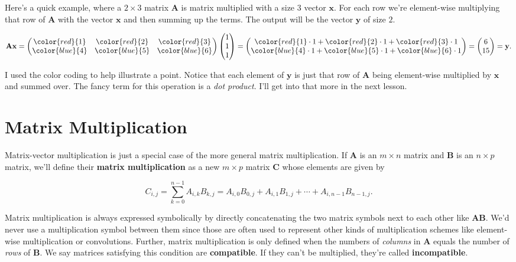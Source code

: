 \documentclass[
  letterpaper,
  DIV=11,
  numbers=noendperiod]{scrreprt}
\begin{document}
Here's a quick example, where a \(2 \times 3\) matrix \(\mathbf{A}\) is
matrix multiplied with a size \(3\) vector \(\mathbf{x}\). For each row
we're element-wise multiplying that row of \(\mathbf{A}\) with the
vector \(\mathbf{x}\) and then summing up the terms. The output will be
the vector \(\mathbf{y}\) of size \(2\).

\[
\mathbf{A} \mathbf{x} = 
\begin{pmatrix}
\color{red}{1} & \color{red}{2} & \color{red}{3} \\
\color{blue}{4} & \color{blue}{5} & \color{blue}{6}
\end{pmatrix}
\begin{pmatrix}
1 \\
1 \\
1
\end{pmatrix} = 
\begin{pmatrix}
\color{red}{1} \cdot 1 + \color{red}{2} \cdot 1 + \color{red}{3} \cdot 1 \\
\color{blue}{4} \cdot 1 + \color{blue}{5} \cdot 1 + \color{blue}{6} \cdot 1 \\
\end{pmatrix} = 
\begin{pmatrix}
6 \\
15
\end{pmatrix} = \mathbf{y}.
\]

I used the color coding to help illustrate a point. Notice that each
element of \(\mathbf{y}\) is just that row of \(\mathbf{A}\) being
element-wise multiplied by \(\mathbf{x}\) and summed over. The fancy
term for this operation is a \emph{dot product}. I'll get into that more
in the next lesson.

\hypertarget{matrix-multiplication}{%
\section{Matrix Multiplication}\label{matrix-multiplication}}

Matrix-vector multiplication is just a special case of the more general
matrix multiplication. If \(\mathbf{A}\) is an \(m \times n\) matrix and
\(\mathbf{B}\) is an \(n \times p\) matrix, we'll define their
\textbf{matrix multiplication} as a new \(m \times p\) matrix
\(\mathbf{C}\) whose elements are given by

\[C_{i,j} = \sum_{k=0}^{n-1} A_{i,k} B_{k,j} = A_{i,0} B_{0,j} + A_{i,1} B_{1,j} + \cdots + A_{i,n-1} B_{n-1,j}.\]

Matrix multiplication is always expressed symbolically by directly
concatenating the two matrix symbols next to each other like
\(\mathbf{A}\mathbf{B}\). We'd never use a multiplication symbol between
them since those are often used to represent other kinds of
multiplication schemes like element-wise multiplication or convolutions.
Further, matrix multiplication is only defined when the numbers of
\emph{columns} in \(\mathbf{A}\) equals the number of \emph{rows} of
\(\mathbf{B}\). We say matrices satisfying this condition are
\textbf{compatible}. If they can't be multiplied, they're called
\textbf{incompatible}.
\end{document}
